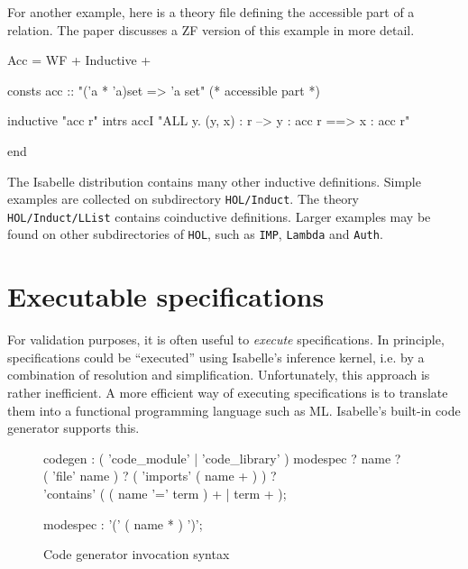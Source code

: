 For another example, here is a theory file defining the accessible part of a
relation.  The paper \cite{paulson-CADE} discusses a ZF version of this
example in more detail.
\begin{ttbox}
Acc = WF + Inductive +

consts acc :: "('a * 'a)set => 'a set"   (* accessible part *)

inductive "acc r"
  intrs
    accI "ALL y. (y, x) : r --> y : acc r ==> x : acc r"

end
\end{ttbox}
The Isabelle distribution contains many other inductive definitions.  Simple
examples are collected on subdirectory \texttt{HOL/Induct}.  The theory
\texttt{HOL/Induct/LList} contains coinductive definitions.  Larger examples
may be found on other subdirectories of \texttt{HOL}, such as \texttt{IMP},
\texttt{Lambda} and \texttt{Auth}.

 


\section{Executable specifications}

For validation purposes, it is often useful to {\em execute} specifications.
In principle, specifications could be ``executed'' using Isabelle's
inference kernel, i.e. by a combination of resolution and simplification.
Unfortunately, this approach is rather inefficient. A more efficient way
of executing specifications is to translate them into a functional
programming language such as ML. Isabelle's built-in code generator
supports this.


\begin{figure}
\begin{rail}
codegen : ( 'code_module' | 'code_library' ) modespec ? name ? \\
  ( 'file' name ) ? ( 'imports' ( name + ) ) ? \\
  'contains' ( ( name '=' term ) + | term + );

modespec : '(' ( name * ) ')';
\end{rail}
\caption{Code generator invocation syntax}
\label{fig:HOL:codegen-invocation}
\end{figure}

